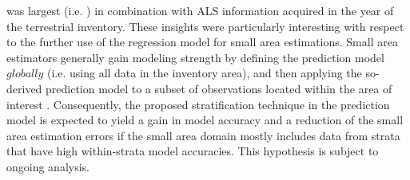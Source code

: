 was largest (i.e. ) in combination with ALS information acquired in the year of the terrestrial inventory. These insights were particularly interesting with respect to the further use of the regression model for small area estimations. Small area estimators generally gain modeling strength by defining the prediction model $globally$ (i.e. using all data in the inventory area), and then applying the so-derived prediction model to a subset of observations located within the area of interest \citep{mandallaz2016}. Consequently, the proposed stratification technique in the prediction model is expected to yield a gain in model accuracy and a reduction of the small area estimation errors if the small area domain mostly includes data from strata that have high within-strata model accuracies. This hypothesis is subject to ongoing analysis.

